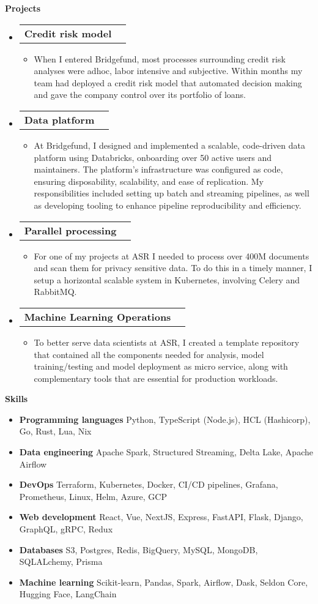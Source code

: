 \documentclass[letterpaper,12pt]{article}[leftmargin=*]
\makeatletter
\def \entryspacing {-0pt}
\renewcommand{\section}[2]{\vspace{5pt}
  \colorbox{secondary}{\color{white}\raggedbottom\normalsize\textbf{{#1}{\hspace{7pt}#2}}}
}
\newcommand{\resumeEntryStart}{\begin{itemize}[leftmargin=2.5mm]}
\newcommand{\resumeEntryEnd}{\end{itemize}\vspace{\entryspacing}}
\newcommand{\resumeItemListStart}{\begin{itemize}[leftmargin=4.5mm]}
\newcommand{\resumeItemListEnd}{\end{itemize}}
\newcommand{\resumeItem}[1]{
  \item\small{
    {#1 \vspace{-2pt}}
  }
}
\newcommand{\resumeEntryTD}[2]{
  \vspace{-1pt}\item[]
    \begin{tabularx}{0.97\textwidth}{X@{\hspace{60pt}}r}
      \textbf{\color{primary}#1} & {\firabook\color{accent}\small#2} \\
    \end{tabularx}\vspace{-6pt}
}
\newcommand{\resumeEntryS}[2]{
  \item[]\small{
    \textbf{\color{primary}#1 }{ #2 \vspace{-6pt}}
  }
}
\makeatother
\begin{document}
\pagebreak
\section{\faFlask}{Projects}

  \resumeEntryStart
    \resumeEntryTD
      {Credit risk model}{}
    \resumeItemListStart
      \resumeItem {When I entered Bridgefund, most processes surrounding credit risk analyses were adhoc, labor intensive and subjective. Within months my team had deployed a credit risk model that automated decision making and gave the company control over its portfolio of loans.}
    \resumeItemListEnd
  \resumeEntryEnd

  \resumeEntryStart
    \resumeEntryTD
      {Data platform}{}
    \resumeItemListStart
      \resumeItem {At Bridgefund, I designed and implemented a scalable, code-driven data platform using Databricks, onboarding over 50 active users and maintainers. The platform's infrastructure was configured as code, ensuring disposability, scalability, and ease of replication. My responsibilities included setting up batch and streaming pipelines, as well as developing tooling to enhance pipeline reproducibility and efficiency.}
    \resumeItemListEnd
  \resumeEntryEnd

  \resumeEntryStart
    \resumeEntryTD
      {Parallel processing}{}
    \resumeItemListStart
      \resumeItem {For one of my projects at ASR I needed to process over 400M documents and scan them for privacy sensitive data. To do this in a timely manner, I setup a horizontal scalable system in Kubernetes, involving Celery and RabbitMQ.}
    \resumeItemListEnd
  \resumeEntryEnd

  \resumeEntryStart
    \resumeEntryTD
      {Machine Learning Operations}{}
    \resumeItemListStart
      \resumeItem {To better serve data scientists at ASR, I created a template repository that contained all the components needed for analysis, model training/testing and model deployment as micro service, along with complementary tools that are essential for production workloads.}
    \resumeItemListEnd
  \resumeEntryEnd

\section{\faGears}{Skills}
 \resumeEntryStart
  \resumeEntryS{Programming languages } {Python, TypeScript (Node.js), HCL (Hashicorp), Go, Rust, Lua, Nix}
  \resumeEntryS{Data engineering } {Apache Spark, Structured Streaming, Delta Lake, Apache Airflow}
  \resumeEntryS{DevOps } {Terraform, Kubernetes, Docker, CI/CD pipelines, Grafana, Prometheus, Linux, Helm, Azure, GCP }
  \resumeEntryS{Web development } {React, Vue, NextJS, Express, FastAPI, Flask, Django, GraphQL, gRPC, Redux }
  \resumeEntryS{Databases } {S3, Postgres, Redis, BigQuery, MySQL, MongoDB, SQLALchemy, Prisma }
  \resumeEntryS{Machine learning } {Scikit-learn, Pandas, Spark, Airflow, Dask, Seldon Core, Hugging Face, LangChain }
 \resumeEntryEnd  
\end{document}
